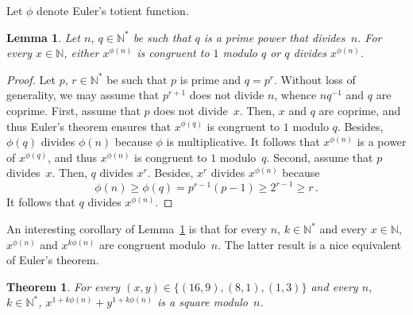 \documentclass[12pt]{article}
\newcommand{\bZ}{\mathbb{Z}}
\newcommand{\bN}{\mathbb{N}} %
\newcommand{\bNast}{\bN^*}
\newtheorem{theorem}{Theorem}
\newtheorem{lemma}{Lemma}
\theoremstyle{definition}
\begin{document}
  Let $\phi$ denote Euler's totient function.

  \begin{lemma} \label{lem:Euler-0-or-1}
    Let $n$, $q \in \bNast$ be such that $q$ is a prime power that divides~$n$.
     For every $x \in \bN$, either $x^{\phi(n)}$ is congruent to $1$ modulo $q$ or $q$ divides $x^{\phi(n)}$.
  \end{lemma}

  \begin{proof}
    Let $p$, $r \in \bNast$ be such that $p$ is prime and $q = p^r$.
    Without loss of generality,
    we may assume that $p^{r + 1}$ does not divide $n$,
    whence $n q^{-1}$ and $q$ are coprime.
    First, assume that $p$ does not divide~$x$.
    Then, $x$ and $q$ are coprime,
    and thus Euler's theorem ensures that $x^{\phi(q)}$ is congruent to $1$ modulo $q$.
    Besides, $\phi(q)$ divides $\phi(n)$ because $\phi$ is multiplicative.
    It follows that $x^{\phi(n)}$ is a power of $x^{\phi(q)}$,
      and thus $x^{\phi(n)}$ is congruent to $1$ modulo~$q$.
    Second, assume that $p$ divides~$x$.
    Then, $q$ divides $x^r$.
    Besides, $x^r$ divides $x^{\phi(n)}$ because
    $$
    \phi(n) \ge \phi(q) = p^{r - 1} (p - 1) \ge 2^{r - 1} \ge r \,.
    $$
    It follows that $q$ divides $x^{\phi(n)}$.
\end{proof} 

An interesting corollary of Lemma~\ref{lem:Euler-0-or-1} is that 
for every $n$, $k \in \bNast$ and every $x \in \bN$,
$x^{\phi(n)}$ and $x^{k \phi(n)}$ are congruent modulo~$n$.
The latter result is a nice equivalent of Euler's theorem.



   \begin{theorem}
    For every $(x, y) \in \{ (16, 9), (8, 1), (1, 3) \}$ and every $n$, $k \in \bNast$, 
    $x^{1 + k \phi(n)} + y^{1 + k \phi(n)}$ is a square modulo~$n$. 
  \end{theorem}
\end{document}
